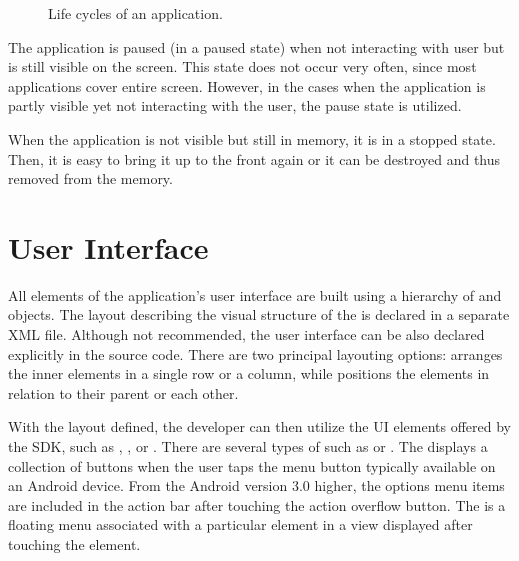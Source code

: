 \begin{figure}[h!]
    \caption{Life cycles of an application.}
\end{figure}

The application is paused (in a paused state) when not interacting with user but is still visible on the screen.
This state does not occur very often, since most applications cover entire screen.
However, in the cases when the application is partly visible yet not interacting with the user, the pause state is utilized. 

When the application is not visible but still in memory, it is in a stopped state.
Then, it is easy to bring it up to the front again or it can be destroyed and thus removed from the memory.

\section{User Interface}
\label{sec:ui}

All elements of the application's user interface are built using a hierarchy of  and  objects.
The layout describing the visual structure of the  is declared in a separate XML file.
Although not recommended, the user interface can be also declared explicitly in the source code. 
There are two principal layouting options:  arranges the inner elements in a single row or a column,
while  positions the elements in relation to their parent or each other.

With the layout defined, the developer can then utilize the UI elements offered by the SDK, such as , ,  or .
There are several types of  such as  or . %
The  displays a collection of buttons when the user taps the menu button typically available on an Android device. 
From the Android version 3\@.0 higher, the options menu items are included in the action bar after touching the action overflow button. %
The  is a floating menu associated with a particular element in a view displayed after touching the element.

